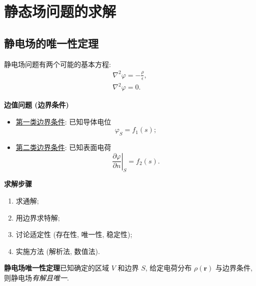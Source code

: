 \section{静态场问题的求解}
\subsection{静电场的唯一性定理}
静电场问题有两个可能的基本方程:
\begin{gather}
    \nabla^2\varphi=-\frac{\rho}{\epsilon}, \\
    \nabla^2\varphi=0.
\end{gather}

\textbf{边值问题 (边界条件)}
\begin{itemize}
    \item \underline{第一类边界条件}: 已知导体电位
          \begin{equation}
              \varphi_S=f_1(s);
          \end{equation}
    \item \underline{第二类边界条件}: 已知表面电荷
          \begin{equation}
              \left.\frac{\partial\varphi}{\partial n}\right|_S=f_2(s).
          \end{equation}
\end{itemize}

\textbf{求解步骤}
\begin{enumerate}[(1)]
    \item 求通解;
    \item 用边界求特解;
    \item 讨论适定性 (存在性, 唯一性, 稳定性);
    \item 实施方法 (解析法, 数值法).
\end{enumerate}

\textbf{静电场唯一性定理}\quad 已知确定的区域 $V$ 和边界 $S$, 给定电荷分布 $\rho(\bm{r})$ 与边界条件, 则静电场\textit{有解且唯一}.

